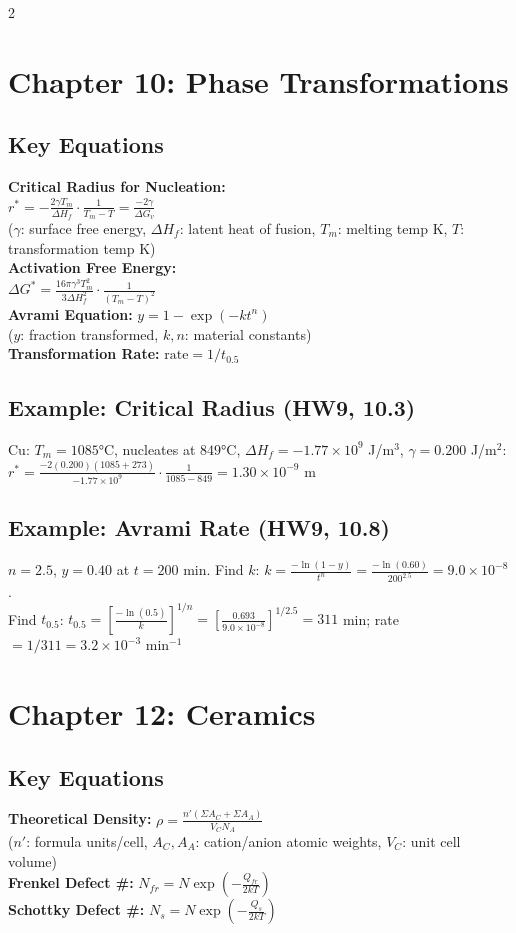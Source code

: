 \documentclass[8pt]{extarticle}
\begin{document}
\begin{multicols*}{2}
\section*{Chapter 10: Phase Transformations}
\subsection*{Key Equations}
\textbf{Critical Radius for Nucleation:} \\
$r^* = -\frac{2\gamma T_m}{\Delta H_f}\cdot\frac{1}{T_m - T} = \frac{-2\gamma}{\Delta G_v}$ \\
($\gamma$: surface free energy, $\Delta H_f$: latent heat of fusion, $T_m$: melting temp K, $T$: transformation temp K) \\
\textbf{Activation Free Energy:} \\
$\Delta G^* = \frac{16\pi\gamma^3 T_m^2}{3\Delta H_f^2}\cdot\frac{1}{(T_m-T)^2}$ \\
\textbf{Avrami Equation:} $y = 1 - \exp(-kt^n)$ \\
($y$: fraction transformed, $k,n$: material constants) \\
\textbf{Transformation Rate:} $\mathrm{rate} = 1/t_{0.5}$
\subsection*{Example: Critical Radius (HW9, 10.3)}
Cu: $T_m=1085$°C, nucleates at $849$°C, $\Delta H_f=-1.77\times10^9$ J/m$^3$, $\gamma=0.200$ J/m$^2$: \\
$r^* = \frac{-2(0.200)(1085+273)}{-1.77\times10^9}\cdot\frac{1}{1085-849} = 1.30\times10^{-9}$ m
\subsection*{Example: Avrami Rate (HW9, 10.8)}
$n=2.5$, $y=0.40$ at $t=200$ min. Find $k$: $k = \frac{-\ln(1-y)}{t^n} = \frac{-\ln(0.60)}{200^{2.5}} = 9.0\times10^{-8}$. \\
Find $t_{0.5}$: $t_{0.5} = \left[\frac{-\ln(0.5)}{k}\right]^{1/n} = \left[\frac{0.693}{9.0\times10^{-8}}\right]^{1/2.5} = 311$ min; rate $= 1/311 = 3.2\times10^{-3}$ min$^{-1}$

\section*{Chapter 12: Ceramics}
\subsection*{Key Equations}
\textbf{Theoretical Density:} $\rho = \frac{n'(\Sigma A_C + \Sigma A_A)}{V_C N_A}$ \\
($n'$: formula units/cell, $A_C,A_A$: cation/anion atomic weights, $V_C$: unit cell volume) \\
\textbf{Frenkel Defect \#:} $N_{fr} = N\exp\!\left(-\frac{Q_{fr}}{2kT}\right)$ \\
\textbf{Schottky Defect \#:} $N_s = N\exp\!\left(-\frac{Q_s}{2kT}\right)$

\end{multicols*}
\end{document}
